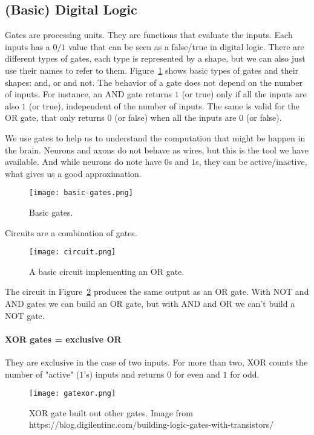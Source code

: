 \documentclass[main]{subfiles}
\begin{document}
\subsection{(Basic) Digital Logic}

Gates are processing units.
They are functions that evaluate the inputs.
Each inputs has a $0/1$ value that can be seen as a false/true in digital logic.
There are different types of gates, each type is represented by a shape, but we can also just use their names to refer to them.
Figure~\ref{fig:basic-gates} shows basic types of gates and their shapes: and, or and not.
The behavior of a gate does not depend on the number of inputs.
For instance, an AND gate returns $1$ (or true) only if all the inputs are also $1$ (or true), independent of the number of inputs.
The same is valid for the OR gate, that only returns $0$ (or false) when all the inputs are $0$ (or false).

We use gates to help us to understand the computation that might be happen in the brain.
Neurons and axons do not behave as wires, but this is the tool we have available.
And while neurons do note have $0$s and $1$s, they can be active/inactive, what gives us a good approximation.

\begin{figure}[h!]
	\centering
	\texttt{[image: basic-gates.png]}
	\caption{Basic gates.}
	\label{fig:basic-gates}
\end{figure}

Circuits are a combination of gates.

\begin{figure}[H]
	\centering
	\texttt{[image: circuit.png]}
	\caption{A basic circuit implementing an OR gate.}
	\label{fig:circuit-gates}
\end{figure}

The circuit in Figure~\ref{fig:circuit-gates} produces the same output as an OR gate.
With NOT and AND gates we can build an OR gate, but with AND and OR we can't build a NOT gate.

\paragraph{XOR gates = exclusive OR}
They are exclusive in the case of two inputs.
For more than two, XOR counts the number of "active" ($1$'s) inputs and returns $0$ for even and $1$ for odd.

\begin{figure}[H]
	\centering
	\texttt{[image: gatexor.png]}
	\caption{XOR gate built out other gates. Image from https://blog.digilentinc.com/building-logic-gates-with-transistors/}
	\label{fig:xor-gates}
\end{figure}
\end{document}
